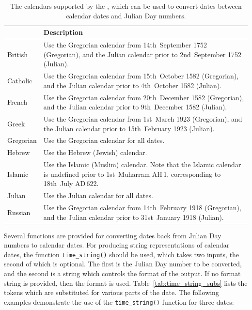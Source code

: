 \begin{table}
\begin{center}
\begin{tabular}{|>{\columncolor{LightGrey}}l|>{\columncolor{LightGrey}}p{9cm}|}
\hline
{\bf Calendar} & {\bf Description} \\
\hline
British &
Use the Gregorian calendar from 14th~September 1752 (Gregorian), and the Julian calendar prior to 2nd~September 1752 (Julian). \\
Catholic &
Use the Gregorian calendar from 15th~October 1582 (Gregorian), and the Julian
calendar prior to 4th~October 1582 (Julian). \\
French &
Use the Gregorian calendar from 20th~December 1582 (Gregorian), and the Julian
calendar prior to 9th~December 1582 (Julian). \\
Greek &
Use the Gregorian calendar from 1st~March 1923 (Gregorian), and the Julian
calendar prior to 15th~February 1923 (Julian). \\
Gregorian &
Use the Gregorian calendar for all dates. \\
Hebrew &
Use the Hebrew (Jewish) calendar. \\
Islamic &
Use the Islamic (Muslim) calendar. Note that the Islamic calendar is undefined prior to 1st~Muharram {\footnotesize AH}\,1, corresponding to 18th~July {\footnotesize AD}\,622. \\
Julian &
Use the Julian calendar for all dates. \\
Russian &
Use the Gregorian calendar from 14th~February 1918 (Gregorian), and the Julian
calendar prior to 31st~January 1918 (Julian). \\
\hline
\end{tabular}
\end{center}
\caption{The calendars supported by the , which can be
used to convert dates between calendar dates and Julian Day numbers.}
\label{tab:calendars}
\end{table}

Several functions are provided for converting dates back from Julian Day
numbers to calendar dates. For producing string representations of calendar
dates, the function {\tt time\_string()} should be used, which takes two inputs, the second of which is
optional. The first is the Julian Day number to be converted, and the second is
a string which controls the format of the output.  If no format string is
provided, then the format\vspace{3mm}\newline
{}\vspace{3mm}\newline
\noindent is used.  Table~\ref{tab:time_string_subs} lists the tokens which are
substituted for various parts of the date. The following examples demonstrate
the use of the {\tt time\_string()} function for three dates:

